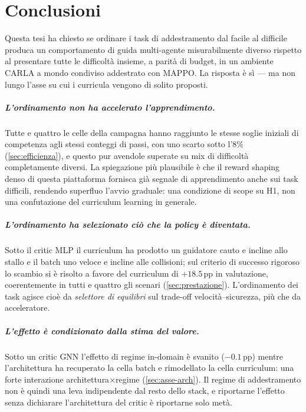 \chapter{Conclusioni}
\label{ch:conclusioni}

Questa tesi ha chiesto se ordinare i task di addestramento dal facile al
difficile produca un comportamento di guida multi-agente misurabilmente
diverso rispetto al presentare tutte le difficoltà insieme, a parità di
budget, in un ambiente CARLA a mondo condiviso addestrato con MAPPO. La
risposta è sì --- ma non lungo l'asse su cui i curricula vengono di
solito proposti.

\paragraph{L'ordinamento non ha accelerato l'apprendimento.}
Tutte e quattro le celle della campagna hanno raggiunto le stesse soglie
iniziali di competenza agli stessi conteggi di passi, con uno scarto
sotto l'8\% (\cref{sec:efficienza}), e questo pur avendole superate su
mix di difficoltà completamente diversi. La spiegazione più plausibile è
che il reward shaping denso di questa piattaforma fornisca già segnale
di apprendimento anche sui task difficili, rendendo superfluo l'avvio
graduale: una condizione di scope su H1, non una confutazione del
curriculum learning in generale.

\paragraph{L'ordinamento ha selezionato ciò che la policy è diventata.}
Sotto il critic MLP il curriculum ha prodotto un guidatore cauto e
incline allo stallo e il batch uno veloce e incline alle collisioni; sul
criterio di successo rigoroso lo scambio si è risolto a favore del
curriculum di $+18.5$\,pp in valutazione, coerentemente in tutti e
quattro gli scenari (\cref{sec:prestazione}). L'ordinamento dei task
agisce cioè da \emph{selettore di equilibri} sul trade-off
velocità--sicurezza, più che da acceleratore.

\paragraph{L'effetto è condizionato dalla stima del valore.}
Sotto un critic GNN l'effetto di regime in-domain è svanito
($-0.1$\,pp) mentre l'architettura ha recuperato la cella batch e
rimodellato la cella curriculum: una forte interazione
architettura$\times$regime (\cref{sec:asse-arch}). Il regime di
addestramento non è quindi una leva indipendente dal resto dello stack,
e riportarne l'effetto senza dichiarare l'architettura del critic è
riportarne solo metà.

